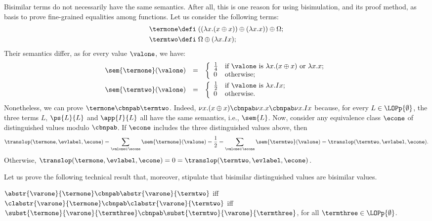 \begin{example}
  Bisimilar terms do not necessarily have the same semantics. After all, this is one
  reason for using bisimulation, and its proof method, as basis to prove
  fine-grained equalities among functions. Let us consider the
  following terms:
  \begin{align*}
        \termone\defi&\;((\lambda x. (x \oplus x))\oplus(\lambda x.x))\oplus\Omega;\\
        \termtwo\defi&\;\Omega\oplus(\lambda x. I x) ;
  \end{align*}                         
  Their semantics                      
  differ, as for every value $\valone$, we have:
  \[
   \begin{array}{rcl}
  \sem{\termone}(\valone) &=& \left\{
    \begin{array}{ll}
      \frac{1}{4} &\mbox{if }\valone \mbox{ is } \lambda x. (x \oplus x) \mbox{ or } \lambda x.x;\\
      0 & \mbox{otherwise};
    \end{array}
    \right.
  \\[10pt]
  \sem{\termtwo}(\valone)& =&  \left\{
    \begin{array}{ll}
      \frac{1}{2} &\mbox{if }\valone \mbox{ is } \lambda x. I x;\\
      0 & \mbox{otherwise}.
    \end{array}
    \right.
    \end{array}
   \]
   Nonetheless,   we can prove
   $\termone\cbnpab\termtwo$. Indeed, $\nu x. (x \oplus x)\cbnpab\nu
   x.x\cbnpab\nu x.I x$ because, for every $L\in\LOPp{\emptyset}$, the three
   terms $L$, $\ps{L}{L}$ and $\app{I}{L}$ all have the same semantics,
   i.e., $\sem{L}$. Now, consider any equivalence class $\econe$ of
   distinguished values modulo $\cbnpab$. If $\econe$ includes the three
   distinguished values above, then
   \[\translop(\termone,
   \evlabel,\econe)=\sum_{\valone\in\econe}\sem{\termone}(\valone) =
   \frac{1}{2} = \sum_{\valone\in\econe}\sem{\termtwo}(\valone) =
   \translop(\termtwo,\evlabel,\econe).
   \]
   Otherwise, $\translop(\termone,
   \evlabel,\econe)= 0 = \translop(\termtwo,\evlabel,\econe)$.
\end{example}
Let us prove the following technical result that, moreover, stipulate that
bisimilar distinguished values are bisimilar values.
\begin{lemma}\label{lemma:lambdaredCBN}
  $\abstr{\varone}{\termone}\cbnpab\abstr{\varone}{\termtwo}$ iff
  $\clabstr{\varone}{\termone}\cbnpab\clabstr{\varone}{\termtwo}$ iff
  $\subst{\termone}{\varone}{\termthree}\cbnpab
  \subst{\termtwo}{\varone}{\termthree}$, for all
  $\termthree\in\LOPp{\emptyset}$.
\end{lemma}
